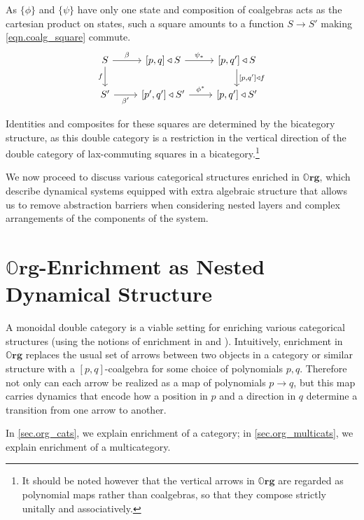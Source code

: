 \documentclass[11pt, one side, article]{memoir}
\theoremstyle{definition}
\theoremstyle{plain}
\newcommand{\Cat}[1]{\mathbf{#1}}%
\newcommand{\0}{\textsf{0}}
\newcommand{\1}{\tn{\textsf{1}}}
\newcommand{\tri}{\mathbin{\triangleleft}}
\newcommand{\org}{{\mathbb{O}\Cat{rg}}}
\begin{document}
As $\{\phi\}$ and $\{\psi\}$ have only one state and composition of coalgebras acts as the cartesian product on states, such a square amounts to a function $S \to S'$ making \eqref{eqn.coalg_square} commute.
\begin{equation}\label{eqn.coalg_square}
\begin{tikzcd}
S \rar{\beta} \dar[swap]{f} & {[p,q]} \tri S \rar{\psi_\ast} & {[p,q']} \tri S \dar{{[p,q']} \tri f} \\
S' \rar[swap]{\beta'} & {[p',q']} \tri S' \rar{\phi^\ast} & {[p,q']} \tri S'
\end{tikzcd}
\end{equation}

Identities and composites for these squares are determined by the bicategory structure, as this double category is a restriction in the vertical direction of the double category of lax-commuting squares in a bicategory.\footnote{It should be noted however that the vertical arrows in $\org$ are regarded as polynomial maps rather than coalgebras, so that they compose strictly unitally and associatively.}

We now proceed to discuss various categorical structures enriched in $\org$, which describe dynamical systems equipped with extra algebraic structure that allows us to remove abstraction barriers when considering nested layers and complex arrangements of the components of the system.


\chapter{$\org$-Enrichment as Nested Dynamical Structure}


A monoidal double category is a viable setting for enriching various categorical structures (using the notions of enrichment in \cite{leinster1999generalized} and \cite{shapiro2022enrichment}). Intuitively, enrichment in $\org$ replaces the usual set of arrows between two objects in a category or similar structure with a $[p,q]$-coalgebra for some choice of polynomials $p,q$. Therefore not only can each arrow be realized as a map of polynomials $p \to q$, but this map carries dynamics that encode how a position in $p$ and a direction in $q$ determine a transition from one arrow to another.

In \cref{sec.org_cats}, we explain enrichment of a category; in \cref{sec.org_multicats}, we explain enrichment of a multicategory.


\end{document}
